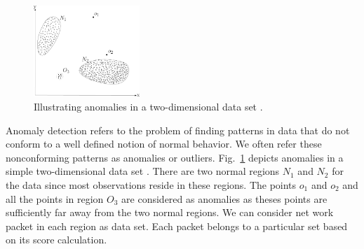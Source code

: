 \documentclass[10pt, conference, compsocconf]{IEEEtran}
\begin{document}
\begin{figure}[h]
\centering
\includegraphics[width=4cm] {Figures/anomaly_fig1}
\caption [Illustrating anomalies in a two-dimensional data set.]{Illustrating anomalies in a two-dimensional data set \cite{1}.}
\label{image1}
\end{figure}

Anomaly detection refers to the problem of finding patterns in data that do not conform to a well defined notion of normal behavior. We often refer these nonconforming patterns as anomalies or outliers. Fig.~\ref{image1} depicts  anomalies in a simple two-dimensional data set \cite{1}. There are two normal regions $N_1$ and $N_2$ for the data since most observations reside in these regions. The points $o_1$ and $o_2$ and all the points in region $O_3$ are considered as anomalies as theses points are sufficiently far away from the two normal regions. We can consider net work packet in each region as data set. Each packet belongs to a particular set based on its score calculation.
\end{document}
